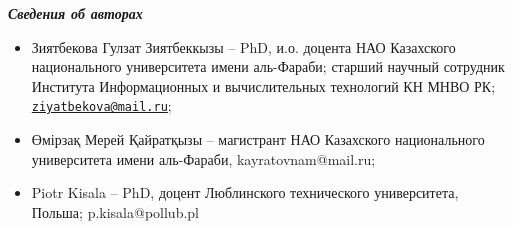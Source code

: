 \begin{center}
\emph{{\bfseries Сведения об авторах}}
\end{center}

\begin{itemize}
\item
Зиятбекова Гулзат Зиятбеккызы -- PhD, и.о. доцента НАО Казахского
национального университета имени аль-Фараби; старший научный сотрудник
Института Информационных и вычислительных технологий КН МНВО РК;
\href{mailto:ziyatbekova@mail.ru}{\nolinkurl{ziyatbekova@mail.ru}};

\item
Өмірзақ Мерей Қайратқызы -- магистрант НАО Казахского национального
университета имени аль-Фараби, kayratovnam@mail.ru;

\item
Piotr Kisala -- PhD, доцент Люблинского технического университета,
Польша; p.kisala@pollub.pl
\end{itemize}
